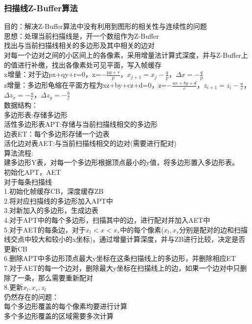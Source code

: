 \documentclass{article}
\begin{document}
\begin{CJK}{UTF8}{gbsn}
	\subsubsection{扫描线Z-Buffer算法}
	目的：解决Z-Buffer算法中没有利用到图形的相关性与连续性的问题\\
	思想：处理当前扫描线是，开一个数组作为Z-Buffer\\
	找出与当前扫描线相关的多边形及其中相关的边对\\
	对每一个边对之间的小区间上的各像素，采用增量法计算式深度，并与Z-Buffer上的值进行补缴，找出各像素处可见平面，写入帧缓存\\
	x增量：对于边px+qy+r=0，x=$-\frac{py+r}{p}$，$x_{j+1}=x_j-\frac{q}{p}$，$\Delta x =-\frac{q}{p}$\\
	z增量：多边形龟缩在平面方程为xz+by+cz+d=0，z=$-\frac{ax+by+d}{c}$，$z_{i+1}=z_i-\frac{a}{c}$，$\Delta z_x=-\frac{a}{c}$，$\Delta z_y=-\frac{b}{c}$\\
	数据结构：\\
	多边形表:存储多边形\\
	活性多边形表APT:存储与当前扫描线相交的多边形\\
	边表ET：每个多边形存储一个边表\\
	活化边对表AET:与当前扫描线相交的边对(需要进行配对)\\
	算法流程:\\
	建多边形Y表，对每一个多边形根据顶点最小的y值，将多边形置入多边形表。\\
	初始化APT，AET\\
	对于每条扫描线\\
	1.初始化帧缓存CB，深度缓存ZB\\
	2.将对应扫描线的多边形加入APT中\\
	3.对新加入的多边形，生成边表\\
	4.对于APT中的每个多边形，扫描其中的边，进行配对并加入AET中\\
	5.对于AET的每条边，对于$x_l<x<x_r$中的每个像素($x_l,x_r$分别是配对的边和扫描线交点中较大和较小的x坐标)，通过增量计算深度，并与ZB进行比较，决定是否更新CB\\
	6.删除APT中多边形顶点最大y坐标在这条扫描线上的多边形，并删除相应ET\\
	7.对于AET的每一个边对，删除最大y坐标在扫描线上的边，如果一个边对中只删除了一条，那么需要重新配对\\
	8.更新$x_l,x_r,z_l$\\
	仍然存在的问题：\\
	每个多边形覆盖的每个像素均要进行计算\\
	多个多边形覆盖的区域需要多次计算\\

\end{CJK}
\end{document}

